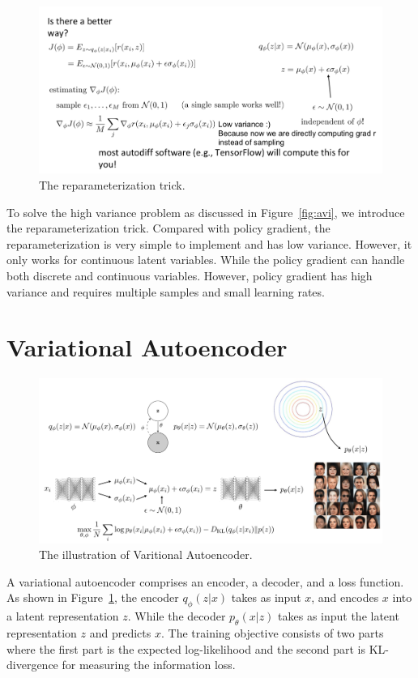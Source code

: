 \documentclass{article}
\begin{document}
\begin{figure}[h]
    \centering
	\includegraphics[width=\textwidth]{fig/trick.png}
	\caption{The reparameterization trick.}
\end{figure}
To solve the high variance problem as discussed in Figure~\ref{fig:avi}, we introduce the reparameterization trick. Compared with policy gradient, the reparameterization is very simple to implement and has low variance. However, it only works for continuous latent variables. While the policy gradient can handle both discrete and continuous variables. However, policy gradient has high variance and requires multiple samples and small learning rates.



\clearpage
\section{Variational Autoencoder}
\begin{figure}[h]
    \centering
	\includegraphics[width=\textwidth]{fig/vae.png}
	\caption{The illustration of Varitional Autoencoder.}
	\label{fig:vae}
\end{figure}


A variational autoencoder comprises an encoder, a decoder, and a loss function. As shown in Figure~\ref{fig:vae}, the encoder $q_{\phi}(z|x)$ takes as input $x$, and encodes $x$ into a latent representation $z$. While the decoder $p_{\theta}(x|z)$ takes as input the latent representation $z$ and predicts $x$.  The training objective consists of two parts where the first part is the expected log-likelihood and the second part is KL-divergence for measuring the information loss.
\small


\end{document}
